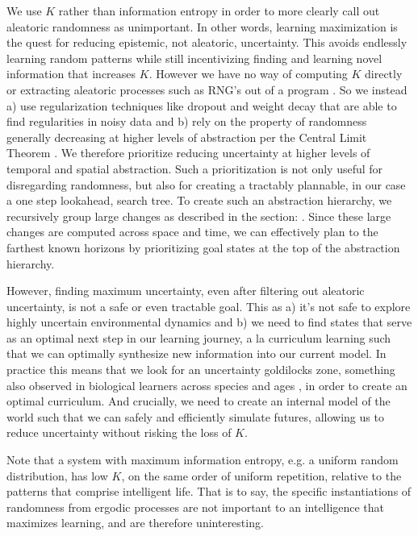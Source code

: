\documentclass{article}
\begin{document}
We use $K$ rather than information entropy in order to more clearly call out aleatoric randomness as unimportant. In other words, learning maximization is the quest for reducing epistemic, not aleatoric, uncertainty. This avoids endlessly learning random patterns while still incentivizing finding and learning novel information that increases $K$. However we have no way of computing $K$ directly or extracting aleatoric processes such as RNG's out of a program \cite{wiki-kolm-cpx-uncomput}. So we instead a) use regularization techniques like dropout and weight decay that are able to find regularities in noisy data and b) rely on the property of randomness generally decreasing at higher levels of abstraction per the Central Limit Theorem \cite{wiki-cent-lim-theo}. We therefore prioritize reducing uncertainty at higher levels of temporal and spatial abstraction. Such a prioritization is not only useful for disregarding randomness, but also for creating a tractably plannable, in our case a one step lookahead, search tree. To create such an abstraction hierarchy, we recursively group large changes as described in the section: . Since these large changes are computed across space and time, we can effectively plan to the farthest known horizons by prioritizing goal states at the top of the abstraction hierarchy.

However, finding maximum uncertainty, even after filtering out aleatoric uncertainty, is not a safe or even tractable goal. This as a) it's not safe to explore highly uncertain environmental dynamics and b) we need to find states that serve as an optimal next step in our learning journey, a la curriculum learning \cite{bengio2009curriculum} such that we can optimally synthesize new information into our current model. In practice this means that we look for an uncertainty goldilocks zone, something also observed in biological learners across species and ages \cite{kidd2012goldilocks}, in order to create an optimal curriculum. And crucially, we need to create an internal model of the world such that we can safely and efficiently simulate futures, allowing us to reduce uncertainty without risking the loss of $K$.

Note that a system with maximum information entropy,
e.g. a uniform random distribution, has low $K$, on the
same order of uniform repetition, relative to the patterns that comprise intelligent life.
That is to say, the specific instantiations of randomness from ergodic processes are not important to an intelligence that maximizes learning, and are therefore uninteresting.
\end{document}

